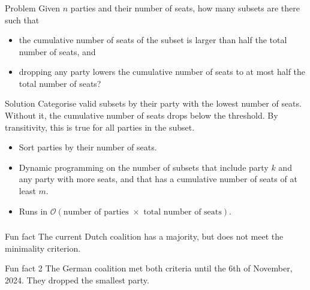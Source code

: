 \begin{frame}
    \frametitle{\problemtitle}
    \begin{block}{Problem}
        Given $n$ parties and their number of seats, how many subsets
        are there such that
        \begin{itemize}
            \item the cumulative number of seats of the subset is larger than
                half the total number of seats, and
            \item dropping any party lowers the cumulative number of seats
                to at most half the total number of seats?
        \end{itemize}
    \end{block}
    \pause
    \begin{block}{Solution}
        Categorise valid subsets by their party with the lowest number of seats.
        Without it, the cumulative number of seats drops below the threshold.
        By transitivity, this is true for all parties in the subset.
        \begin{itemize}
            \item Sort parties by their number of seats.
            \item Dynamic programming on the number of subsets
                that include party $k$ and any party with more seats,
                and that has a cumulative number of seats of at least $m$.
            \item Runs in $\mathcal{O}(\text{number of parties }\times\text{ total number of seats})$.
        \end{itemize}
    \end{block}
    \pause
    \solvestats
\end{frame}

\begin{frame}
    \frametitle{\problemtitle}
	\begin{block}{Fun fact}
		The current Dutch coalition has a majority, but does not meet the minimality criterion.
	\end{block}
	\pause
	\begin{block}{Fun fact 2}
		The German coalition met both criteria until the 6th of November, 2024. They dropped the smallest party.
	\end{block}
\end{frame}
